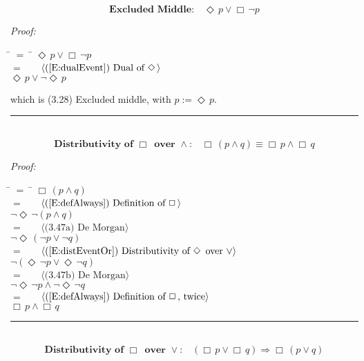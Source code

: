 \documentclass[fleqn, leqno]{article}
\newcommand{\lgap}{2pt}                             %
\newcommand{\mymathindent}{24pt}                    %
\newcommand{\Event}{\Diamond\,}
\newcommand{\Always}{\Box\,}
\newcommand{\myqed}{\hfill\rule[-.23ex]{1.2ex}{2.0ex}}
\newcommand{\Gll} {\langle}                         %
\newcommand{\Ggg} {\rangle}                         %
\newcommand{\Hint}[1]     {\ \ \ $\Gll              \mbox{#1} \Ggg$ }   %
\begin{document}
\begin{equation}\label{E:excludedMid}
\textbf{Excluded Middle:}\quad \Event p \lor \Always\lnot p
\end{equation}

\emph{Proof:}
\begin{tabbing}
\hspace{\mymathindent} \= $= \;$ \= \kill
  \> \>   $\Event p \lor \Always\lnot p$\\[\lgap]
  \> $=$  \>  \Hint{(\ref{E:dualEvent}) Dual of $\Event$}\\[\lgap]
  \> \>   $\Event p \lor \lnot\Event p$\\[\lgap]
\end{tabbing}
which is (3.28) Excluded middle, with $p := \Event p$. \myqed\\[\lgap]


\begin{equation}\label{E:distAlwaysAnd}
\textbf{Distributivity of $\Always$ over $\land$:}\quad \Always (p \land q) \equiv \Always p \land \Always q
\end{equation}

\emph{Proof:}
\begin{tabbing}
\hspace{\mymathindent} \= $= \;$ \= \kill
  \> \>   $\Always (p \land q)$\\[\lgap]
  \> $=$  \>  \Hint{(\ref{E:defAlways}) Definition of $\Always$}\\[\lgap]
  \> \>   $\lnot\Event\lnot (p \land q)$\\[\lgap]
  \> $=$  \>  \Hint{(3.47a) De Morgan}\\[\lgap]
  \> \>   $\lnot\Event (\lnot p \lor \lnot q)$\\[\lgap]
  \> $=$  \>  \Hint{(\ref{E:distEventOr}) Distributivity of $\Event$ over $\lor$}\\[\lgap]
  \> \>   $\lnot (\Event\lnot p \lor \Event\lnot q)$\\[\lgap]
  \> $=$  \>  \Hint{(3.47b) De Morgan}\\[\lgap]
  \> \>   $\lnot\Event\lnot p \land \lnot\Event\lnot q$\\[\lgap]
  \> $=$  \>  \Hint{(\ref{E:defAlways}) Definition of $\Always$, twice}\\[\lgap]
  \> \>   $\Always p \land \Always q$
\end{tabbing}
\myqed\\[\lgap]


\begin{equation}\label{E:distAlwaysOr}
\textbf{Distributivity of $\Always$ over $\lor$:}\quad (\Always p \lor \Always q) \Rightarrow \Always (p \lor q)
\end{equation}
\end{document}
